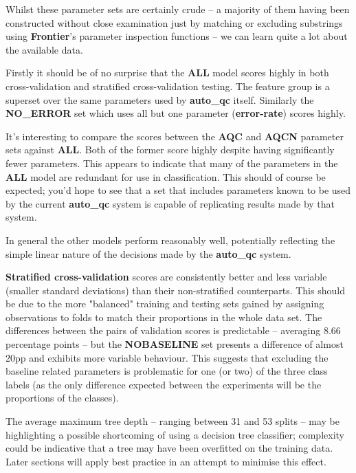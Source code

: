 Whilst these parameter sets are certainly crude -- a majority of them having
been constructed without close examination just by matching or excluding
substrings using \textbf{Frontier}'s parameter inspection functions -- we can
learn quite a lot about the available data.

Firstly it should be of no surprise that the \textbf{ALL} model scores highly in
both cross-validation and stratified cross-validation testing. The feature group
is a superset over the same parameters used by \textbf{auto\_qc} itself.
Similarly the \textbf{NO\_ERROR} set which uses all but one parameter
(\textbf{error-rate}) scores highly.

It's interesting to compare the scores between the \textbf{AQC} and
\textbf{AQCN} parameter sets against \textbf{ALL}. Both of the former score
highly despite having significantly fewer parameters. This appears to indicate
that many of the parameters in the \textbf{ALL} model are redundant for use in
classification. This should of course be expected; you'd hope to see that a set
that includes parameters known to be used by the current \textbf{auto\_qc} system
is capable of replicating results made by that system.

In general the other models perform reasonably well, potentially reflecting the
simple linear nature of the decisions made by the \textbf{auto\_qc} system.

\textbf{Stratified cross-validation} scores are consistently better and less variable
(smaller standard deviations) than their non-stratified counterparts. This
should be due to the more "balanced" training and testing sets
gained by assigning observations to folds to match their proportions in the
whole data set. The differences between the pairs of validation scores is
predictable -- averaging 8.66 percentage points -- but the \textbf{NOBASELINE}
set presents a difference of almost 20pp and exhibits more variable behaviour.
This suggests that excluding the baseline related parameters is problematic for
one (or two) of the three class labels (as the only difference expected between the
experiments will be the proportions of the classes).

The average maximum tree depth -- ranging between 31 and 53 splits -- may be
highlighting a possible shortcoming of using a decision tree classifier;
complexity could be indicative that a tree may have been overfitted on the training
data. Later sections will apply best practice in an attempt to minimise this
effect.


